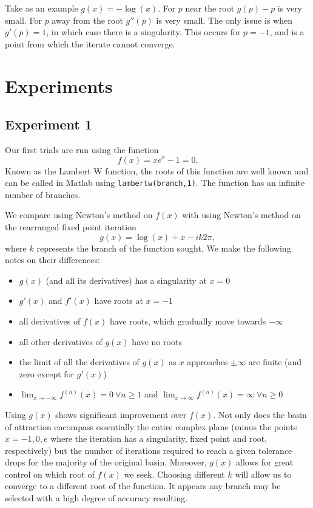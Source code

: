 \documentclass{book}
\begin{document}
Take as an example $g(x) = -\log(x)$.
For $p$ near the root $g(p) - p$ is very small.
For $p$ away from the root $g''(p)$ is very small.
The only issue is when $g'(p) = 1$, in which case there is a singularity.
This occurs for $p=-1$, and is a point from which the iterate cannot converge.

\section{Experiments}

\subsection{Experiment 1}

Our first trials are run using the function
\begin{equation}
f(x) = x e^x - 1 = 0 .
\end{equation}
Known as the Lambert W function, the roots of this function are well known and can be called in Matlab using \texttt{lambertw(branch,1)}.
The function has an infinite number of branches.

We compare using Newton's method on $f(x)$ with using Newton's method on the rearranged fixed point iteration
\begin{equation}
g(x) = \log(x) + x - i k 2 \pi ,
\end{equation}
where $k$ represents the branch of the function sought.
We make the following notes on their differences:
\begin{itemize}
\item $g(x)$ (and all its derivatives) has a singularity at $x=0$
\item $g'(x)$ and $f'(x)$ have roots at $x=-1$
\item all derivatives of $f(x)$ have roots, which gradually move towards $-\infty$
\item all other derivatives of $g(x)$ have no roots
\item the limit of all the derivatives of $g(x)$ as $x$ approaches $\pm \infty$ are finite (and zero except for $g'(x)$)
\item $\lim_{x \to -\infty} f^{(n)}(x) = 0 \ \forall n\geq 1$ and $\lim_{x \to \infty} f^{(n)}(x) = \infty \ \forall n \geq 0$
\end{itemize}

Using $g(x)$ shows significant improvement over $f(x)$.
Not only does the basin of attraction encompass essentially the entire complex plane (minus the points $x=-1, 0, e$ where the iteration has a singularity, fixed point and root, respectively) but the number of iterations required to reach a given tolerance drops for the majority of the original basin.
Moreover, $g(x)$ allows for great control on which root of $f(x)$ we seek.
Choosing different $k$ will allow us to converge to a different root of the function.
It appears any branch may be selected with a high degree of accuracy resulting.
\end{document}
